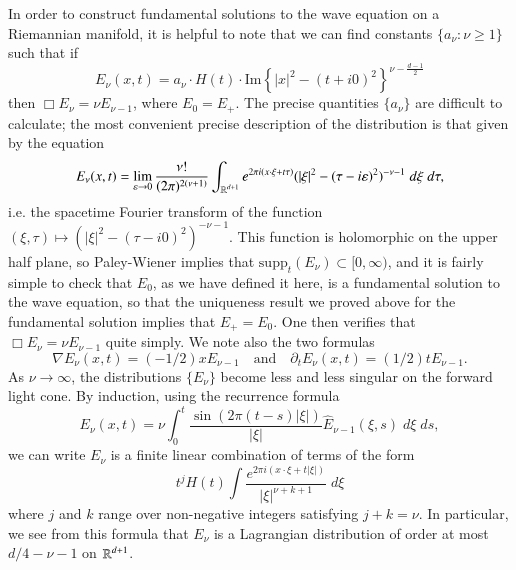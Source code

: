 In order to construct fundamental solutions to the wave equation on a Riemannian manifold, it is helpful to note that we can find constants $\{ a_\nu : \nu \geq 1 \}$ such that if
%
\[ E_\nu(x,t) = a_\nu \cdot H(t) \cdot \text{Im} \left\{ |x|^2 - (t + i0)^2 \right\}^{\nu - \frac{d-1}{2}} \] 
%
then $\Box E_\nu = \nu E_{\nu - 1}$, where $E_0 = E_+$. The precise quantities $\{ a_\nu \}$ are difficult to calculate; the most convenient precise description of the distribution is that given by the equation
%
\[ E_\nu(x,t) = \lim_{\varepsilon \to 0} \frac{\nu !}{(2 \pi)^{2 (\nu + 1)}} \int_{\operatorname{\mathbb{R}}^{d+1}} e^{2 \pi i (x \cdot \xi + t \tau)} (|\xi|^2 - (\tau - i \varepsilon)^2)^{-\nu - 1}\; d\xi\; d\tau, \]
%
i.e. the spacetime Fourier transform of the function $(\xi,\tau) \mapsto (|\xi|^2 - (\tau - i 0)^2)^{-\nu - 1}$. This function is holomorphic on the upper half plane, so Paley-Wiener implies that $\text{supp}_t(E_\nu) \subset [0,\infty)$, and it is fairly simple to check that $E_0$, as we have defined it here, is a fundamental solution to the wave equation, so that the uniqueness result we proved above for the fundamental solution implies that $E_+ = E_0$. One then verifies that $\Box E_\nu = \nu E_{\nu - 1}$ quite simply. We note also the two formulas
%
\[ \nabla E_\nu(x,t) = (-1/2) x E_{\nu - 1} \quad\text{and}\quad \partial_t E_\nu(x,t) = (1/2) t E_{\nu-1}. \]
%
As $\nu \to \infty$, the distributions $\{ E_\nu \}$ become less and less singular on the forward light cone. By induction, using the recurrence formula
%
\[ E_\nu(x,t) = \nu \int_0^t \frac{\sin(2 \pi (t - s) |\xi|)}{|\xi|} \widehat{E}_{\nu-1}(\xi,s)\; d\xi\; ds, \]
%
we can write $E_\nu$ is a finite linear combination of terms of the form
%
\[ t^j H(t) \int \frac{e^{2 \pi i (x \cdot \xi + t |\xi|)}}{|\xi|^{\nu + k + 1}}\; d\xi \]
%
where $j$ and $k$ range over non-negative integers satisfying $j + k = \nu$. In particular, we see from this formula that $E_\nu$ is a Lagrangian distribution of order at most $d/4 - \nu - 1$ on $\operatorname{\mathbb{R}}^{d+1}$.

%
%
%
%
%  
%

